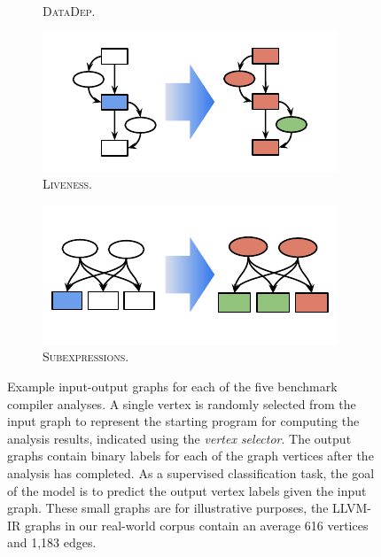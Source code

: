 \begin{figure}
\begin{subfigure}{.19\linewidth}
    \caption{\textsc{DataDep}.}
    \label{subfig:dataflow_datadep}
  \end{subfigure}
  \hfill
  \begin{subfigure}{.19\linewidth}
    \includegraphics[width=\linewidth]{images/dataflow/D_liveness}%
    \caption{\textsc{Liveness}.}
    \label{subfig:dataflow_liveness}
  \end{subfigure}
  \hfill
  \begin{subfigure}{.19\linewidth}
    \includegraphics[width=\linewidth]{images/dataflow/E_subexpressions}%
    \caption{\textsc{Subexpressions}.}
    \label{subfig:dataflow_subexpressions}
  \end{subfigure}
  \caption{%
    Example input-output graphs for each of the five benchmark
    compiler analyses. A single vertex is randomly selected from the
    input graph to represent the starting program for computing the
    analysis results, indicated using the \emph{vertex selector}. The
    output graphs contain binary labels for each of the graph vertices
    after the analysis has completed. As a supervised classification
    task, the goal of the model is to predict the output vertex labels
    given the input graph. These small graphs are for illustrative
    purposes, the LLVM-IR graphs in our real-world corpus contain an
    average 616 vertices and 1,183 edges.%
  }%
  \label{fig:dataflow_examples}%
\end{figure}

